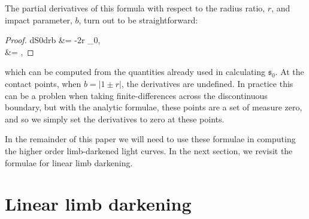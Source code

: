 \documentclass[modern,trackchanges]{aastex63}
\begin{document}
The partial derivatives of this formula with respect to the radius
ratio, $r$, and impact parameter, $b$, turn out to be straightforward:
\begin{proof}{dS0drb}\label{eq:dS0_drb}
 &= -2r \kappa_0,\nonumber\\
 &= ,
\end{proof}
which can be computed from the quantities already used in calculating $\mathfrak{s}_0$.
At the contact points, when $b = \vert 1\pm r\vert$, the derivatives are undefined.
In practice this can be a problen when taking finite-differences across
the discontinuous boundary, but with the analytic formulae, these points
are a set of measure zero, and so we simply set the derivatives to zero
at these points.

In the remainder of this paper we will need to use these formulae in computing
the higher order limb-darkened light curves.  In the next section, we revisit the formulae
for linear limb darkening.

\section{Linear limb darkening}
\label{sec:reparam}
\end{document}

